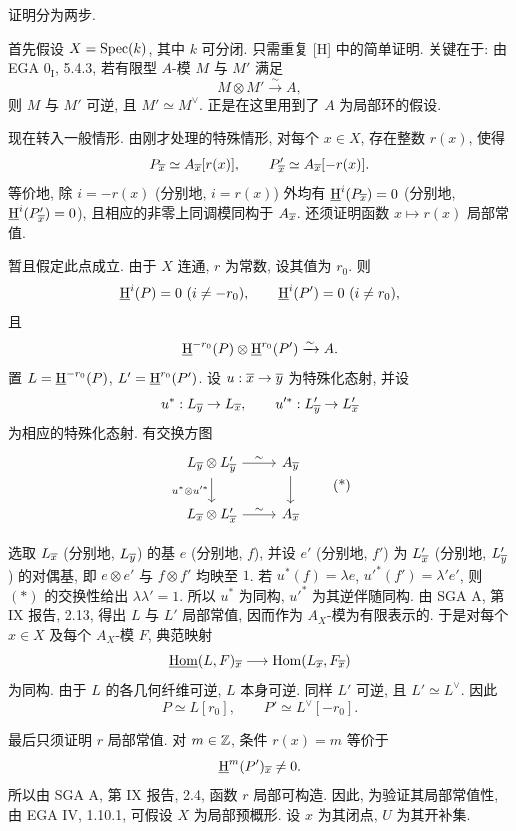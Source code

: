 \begin{prooftext}
证明分为两步.

首先假设 $X=\operatorname{Spec}(k)$, 其中 $k$ 可分闭. 只需重复 [H] 中的简单证明. 关键在于: 由 EGA $0_{\mathrm I}$, 5.4.3, 若有限型 $A$-模 $M$ 与 $M'$ 满足
\[
   M\otimes M'\xrightarrow{\sim}A,
\]
则 $M$ 与 $M'$ 可逆, 且 $M'\simeq M^\vee$. 正是在这里用到了 $A$ 为局部环的假设.

现在转入一般情形. 由刚才处理的特殊情形, 对每个 $x\in X$, 存在整数 $r(x)$, 使得
\[
   P_{\overline{x}}\simeq A_{\overline{x}}[r(x)],\qquad
   P'_{\overline{x}}\simeq A_{\overline{x}}[-r(x)].
\]
等价地, 除 $i=-r(x)$ (分别地, $i=r(x)$) 外均有 $\underline{\mathrm H}^i(P_{\overline{x}})=0$ (分别地, $\underline{\mathrm H}^i(P'_{\overline{x}})=0$), 且相应的非零上同调模同构于 $A_{\overline{x}}$. 还须证明函数 $x\mapsto r(x)$ 局部常值.

暂且假定此点成立. 由于 $X$ 连通, $r$ 为常数, 设其值为 $r_0$. 则
\[
   \underline{\mathrm H}^i(P)=0\ (i\ne-r_0),\qquad \underline{\mathrm H}^i(P')=0\ (i\ne r_0),
\]
且
\[
   \underline{\mathrm H}^{-r_0}(P)\otimes\underline{\mathrm H}^{r_0}(P')\xrightarrow{\sim}A.
\]
置 $L=\underline{\mathrm H}^{-r_0}(P)$, $L'=\underline{\mathrm H}^{r_0}(P')$. 设 $u:\overline{x}\to\overline{y}$ 为特殊化态射, 并设
\[
   u^*:L_{\overline{y}}\to L_{\overline{x}},\qquad u'^*:L'_{\overline{y}}\to L'_{\overline{x}}
\]
为相应的特殊化态射. 有交换方图
\begin{equation}
\begin{tikzcd}
L_{\ol{y}}\otimes L'_{\ol{y}} \arrow[r,"\sim"] \arrow[d,"u^*\otimes u'^*"'] & A_{\ol{y}} \arrow[d] \\
L_{\ol{x}}\otimes L'_{\ol{x}} \arrow[r,"\sim"] & A_{\ol{x}}
\end{tikzcd}
\tag{*}
\end{equation}
\par\medskip
选取 $L_{\overline{x}}$ (分别地, $L_{\overline{y}}$) 的基 $e$ (分别地, $f$), 并设 $e'$ (分别地, $f'$) 为 $L'_{\overline{x}}$ (分别地, $L'_{\overline{y}}$) 的对偶基, 即 $e\otimes e'$ 与 $f\otimes f'$ 均映至 $1$. 若 $u^*(f)=\lambda e$, $u'^*(f')=\lambda'e'$, 则 $(*)$ 的交换性给出 $\lambda\lambda'=1$. 所以 $u^*$ 为同构, $u'^*$ 为其逆伴随同构. 由 SGA A, 第 IX 报告, 2.13, 得出 $L$ 与 $L'$ 局部常值, 因而作为 $A_X$-模为有限表示的. 于是对每个 $x\in X$ 及每个 $A_X$-模 $F$, 典范映射
\[
   \underline{\operatorname{Hom}}(L,F)_{\overline{x}}\longrightarrow\operatorname{Hom}(L_{\overline{x}},F_{\overline{x}})
\]
为同构. 由于 $L$ 的各几何纤维可逆, $L$ 本身可逆. 同样 $L'$ 可逆, 且 $L'\simeq L^\vee$. 因此
\[
   P\simeq L[r_0],\qquad P'\simeq L^\vee[-r_0].
\]

最后只须证明 $r$ 局部常值. 对 $m\in\mathbb{Z}$, 条件 $r(x)=m$ 等价于
\[
   \underline{\mathrm H}^m(P')_{\overline{x}}\ne0.
\]
所以由 SGA A, 第 IX 报告, 2.4, 函数 $r$ 局部可构造. 因此, 为验证其局部常值性, 由 EGA IV, 1.10.1, 可假设 $X$ 为局部预概形. 设 $x$ 为其闭点, $U$ 为其开补集.


\end{prooftext}
